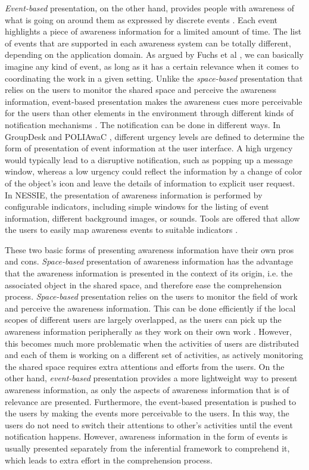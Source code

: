 \emph{Event-based} presentation, on the other hand, provides people with awareness of what is going on around them as expressed by discrete events \cite{rittenbruch2009a}. Each event highlights a piece of awareness information for a limited amount of time. The list of events that are supported in each awareness system can be totally different, depending on the application domain. As argued by Fuchs et al \cite{Fuchs1995}, we can basically imagine any kind of event, as long as it has a certain relevance when it comes to coordinating the work in a given setting. Unlike the \emph{space-based} presentation that relies on the users to monitor the shared space and perceive the awareness information, event-based presentation makes the awareness cues more perceivable for the users than other elements in the environment through different kinds of notification mechanisms \cite{McCrickard2003}. The notification can be done in different ways. In GroupDesk \cite{Fuchs1995} and POLIAwaC \cite{sohlenkamp2000po}, different urgency levels are defined to determine the form of presentation of event information at the user interface. A high urgency would typically lead to a disruptive notification, such as popping up a message window, whereas a low urgency could reflect the information by a change of color of the object's icon and leave the details of information to explicit user request. In NESSIE, the presentation of awareness information is performed by configurable indicators, including simple windows for the listing of event information, different background images, or sounds. Tools are offered that allow the users to easily map awareness events to suitable indicators \cite{prinz1999a}.

These two basic forms of presenting awareness information have their own pros and cons. \emph{Space-based} presentation of awareness information has the advantage that the awareness information is presented in the context of its origin, i.e. the associated object in the shared space, and therefore ease the comprehension process. \emph{Space-based} presentation relies on the users to monitor the field of work and perceive the awareness information. This can be done efficiently if the local scopes of different users are largely overlapped, as the users can pick up the awareness information peripherally as they work on their own work \cite{schmidt2002a}. However, this becomes much more problematic when the activities of users are distributed and each of them is working on a different set of activities, as actively monitoring the shared space requires extra attentions and efforts from the users. On the other hand, \emph{event-based} presentation provides a more lightweight way to present awareness information, as only the aspects of awareness information that is of relevance are presented. Furthermore, the event-based presentation is pushed to the users by making the events more perceivable to the users. In this way, the users do not need to switch their attentions to other's activities until the event notification happens. However, awareness information in the form of events is usually presented separately from the inferential framework to comprehend it, which leads to extra effort in the comprehension process.
 
